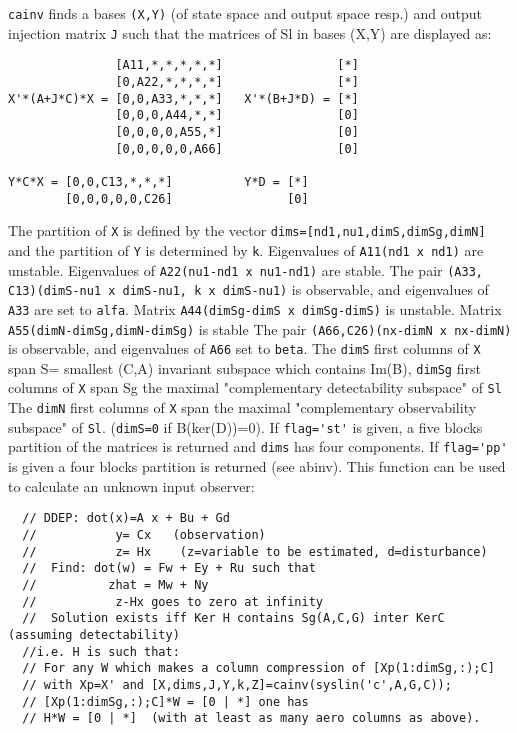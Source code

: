 \begin{mandescription}
  \verb!cainv! finds a bases \verb!(X,Y)! (of state space and output space resp.)
  and output injection matrix \verb!J! such that the matrices of Sl in 
  bases (X,Y) are displayed as:
\begin{verbatim}
               [A11,*,*,*,*,*]                [*]
               [0,A22,*,*,*,*]                [*]
X'*(A+J*C)*X = [0,0,A33,*,*,*]   X'*(B+J*D) = [*]
               [0,0,0,A44,*,*]                [0]
               [0,0,0,0,A55,*]                [0]
               [0,0,0,0,0,A66]                [0]

Y*C*X = [0,0,C13,*,*,*]          Y*D = [*]
        [0,0,0,0,0,C26]                [0]
\end{verbatim}

The partition of \verb!X! is defined by the vector 
\verb!dims=[nd1,nu1,dimS,dimSg,dimN]! and the partition of \verb!Y!
is determined by \verb!k!.
Eigenvalues of \verb!A11!\verb!(nd1 x nd1)! are unstable.
Eigenvalues of \verb!A22!\verb!(nu1-nd1 x nu1-nd1)! are stable.
The pair \verb!(A33, C13)!\verb!(dimS-nu1 x dimS-nu1, k x dimS-nu1)! is observable, 
and eigenvalues of \verb!A33! are set to \verb!alfa!.
Matrix \verb!A44!\verb!(dimSg-dimS x dimSg-dimS)! is unstable.
Matrix \verb!A55!\verb!(dimN-dimSg,dimN-dimSg)! is stable
The pair \verb!(A66,C26)!\verb!(nx-dimN x nx-dimN)! is observable, 
and eigenvalues of \verb!A66! set to \verb!beta!.
The \verb!dimS! first columns of \verb!X! span S= smallest (C,A) invariant
subspace which contains Im(B), \verb!dimSg! first columns of \verb!X!
span Sg the maximal "complementary detectability subspace" of \verb!Sl!
The \verb!dimN! first columns of \verb!X! span the maximal
"complementary observability subspace" of \verb!Sl!. 
(\verb!dimS=0! if B(ker(D))=0).
If \verb!flag='st'! is given, a five blocks partition of the matrices is 
returned and \verb!dims! has four components. If \verb!flag='pp'! is 
given a four blocks partition is returned (see abinv).
This function can be used to calculate an unknown input observer:
\begin{verbatim}
  // DDEP: dot(x)=A x + Bu + Gd
  //           y= Cx   (observation)
  //           z= Hx    (z=variable to be estimated, d=disturbance)
  //  Find: dot(w) = Fw + Ey + Ru such that
  //          zhat = Mw + Ny
  //           z-Hx goes to zero at infinity
  //  Solution exists iff Ker H contains Sg(A,C,G) inter KerC (assuming detectability)
  //i.e. H is such that:
  // For any W which makes a column compression of [Xp(1:dimSg,:);C]
  // with Xp=X' and [X,dims,J,Y,k,Z]=cainv(syslin('c',A,G,C));
  // [Xp(1:dimSg,:);C]*W = [0 | *] one has
  // H*W = [0 | *]  (with at least as many aero columns as above).
\end{verbatim}
\end{mandescription}
\begin{manseealso}
      
\end{manseealso}
